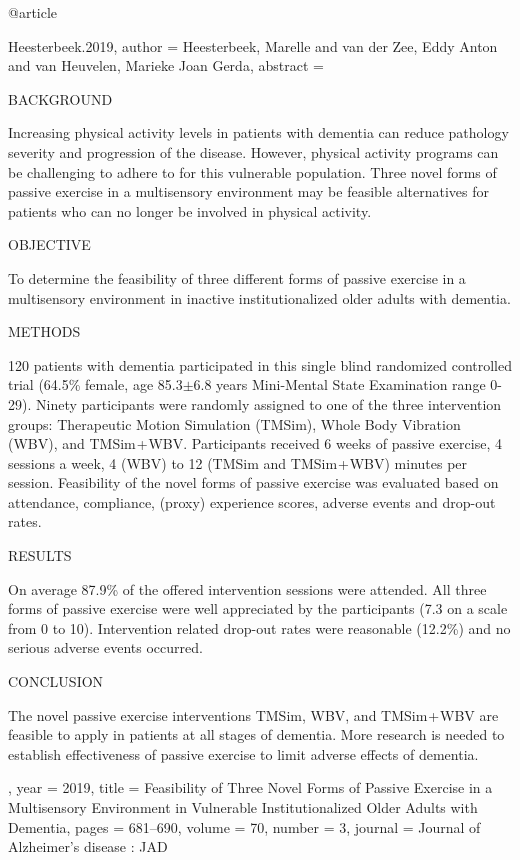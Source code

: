 @article{Heesterbeek.2019,
 author = {Heesterbeek, Marelle and {van der Zee}, Eddy Anton and {van Heuvelen}, Marieke Joan Gerda},
 abstract = {BACKGROUND

Increasing physical activity levels in patients with dementia can reduce pathology severity and progression of the disease. However, physical activity programs can be challenging to adhere to for this vulnerable population. Three novel forms of passive exercise in a multisensory environment may be feasible alternatives for patients who can no longer be involved in physical activity.

OBJECTIVE

To determine the feasibility of three different forms of passive exercise in a multisensory environment in inactive institutionalized older adults with dementia.

METHODS

120 patients with dementia participated in this single blind randomized controlled trial (64.5{\%} female, age 85.3$\pm$6.8 years Mini-Mental State Examination range 0-29). Ninety participants were randomly assigned to one of the three intervention groups: Therapeutic Motion Simulation (TMSim), Whole Body Vibration (WBV), and TMSim + WBV. Participants received 6 weeks of passive exercise, 4 sessions a week, 4 (WBV) to 12 (TMSim and TMSim + WBV) minutes per session. Feasibility of the novel forms of passive exercise was evaluated based on attendance, compliance, (proxy) experience scores, adverse events and drop-out rates.

RESULTS

On average 87.9{\%} of the offered intervention sessions were attended. All three forms of passive exercise were well appreciated by the participants (7.3 on a scale from 0 to 10). Intervention related drop-out rates were reasonable (12.2{\%}) and no serious adverse events occurred.

CONCLUSION

The novel passive exercise interventions TMSim, WBV, and TMSim + WBV are feasible to apply in patients at all stages of dementia. More research is needed to establish effectiveness of passive exercise to limit adverse effects of dementia.},
 year = {2019},
 title = {{Feasibility of Three Novel Forms of Passive Exercise in a Multisensory Environment in Vulnerable Institutionalized Older Adults with Dementia}},
 pages = {681--690},
 volume = {70},
 number = {3},
 journal = {{Journal of Alzheimer's disease : JAD}}
}



